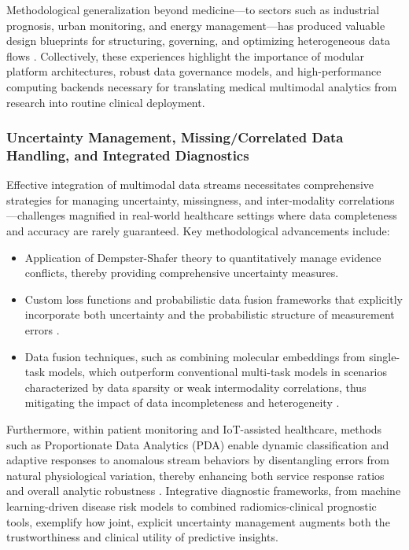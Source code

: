 \documentclass[sigconf]{acmart}
\begin{document}
Methodological generalization beyond medicine—to sectors such as industrial prognosis, urban monitoring, and energy management—has produced valuable design blueprints for structuring, governing, and optimizing heterogeneous data flows \cite{ref66,ref67,ref68,ref70,ref71,ref72,ref75,ref84}. Collectively, these experiences highlight the importance of modular platform architectures, robust data governance models, and high-performance computing backends necessary for translating medical multimodal analytics from research into routine clinical deployment.

\subsubsection{Uncertainty Management, Missing/Correlated Data Handling, and Integrated Diagnostics}

Effective integration of multimodal data streams necessitates comprehensive strategies for managing uncertainty, missingness, and inter-modality correlations—challenges magnified in real-world healthcare settings where data completeness and accuracy are rarely guaranteed. Key methodological advancements include:

\begin{itemize}
    \item Application of Dempster-Shafer theory to quantitatively manage evidence conflicts, thereby providing comprehensive uncertainty measures.
    \item Custom loss functions and probabilistic data fusion frameworks that explicitly incorporate both uncertainty and the probabilistic structure of measurement errors \cite{ref73,ref76,ref77,ref84}.
    \item Data fusion techniques, such as combining molecular embeddings from single-task models, which outperform conventional multi-task models in scenarios characterized by data sparsity or weak intermodality correlations, thus mitigating the impact of data incompleteness and heterogeneity \cite{ref89}.
\end{itemize}

Furthermore, within patient monitoring and IoT-assisted healthcare, methods such as Proportionate Data Analytics (PDA) enable dynamic classification and adaptive responses to anomalous stream behaviors by disentangling errors from natural physiological variation, thereby enhancing both service response ratios and overall analytic robustness \cite{ref90}. Integrative diagnostic frameworks, from machine learning-driven disease risk models to combined radiomics-clinical prognostic tools, exemplify how joint, explicit uncertainty management augments both the trustworthiness and clinical utility of predictive insights.
\end{document}
